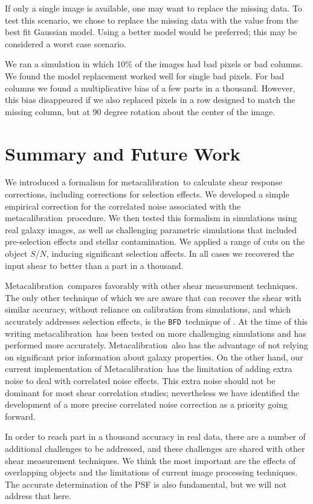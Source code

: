 \documentclass[a4paper,fleqn,usenatbib]{mnras}
\newcommand{\snr}{$S/N$}
\newcommand{\mcal}{metacalibration}
\newcommand{\Mcal}{Metacalibration}
\newcommand{\bfd}{\texttt{BFD}}
\begin{document}
If only a single image is available, one may want to replace the missing data.
To test this scenario, we chose to replace the missing data with the value from
the best fit Gaussian model.  Using a better model would be preferred; this may
be considered a worst case scenario.

We ran a simulation in which 10\% of the images had bad pixels or bad columns.
We found the model replacement worked well for single bad pixels. For bad
columns we found a multiplicative bias of a few parts in a thousand.  However,
this bias disappeared if we also replaced pixels in a row designed to match the
missing column, but at 90 degree rotation about the center of the image.

\section{Summary and Future Work}

We introduced a formalism for \mcal\ to calculate shear response corrections,
including corrections for selection effects. We developed a simple empirical
correction for the correlated noise associated with the \mcal\ procedure.  We
then tested this formalism in simulations using real galaxy images, as well as
challenging parametric simulations that included pre-selection effects and
stellar contamination.  We applied a range of cuts on the object \snr, inducing
significant selection affects.  In all cases we recovered the input shear to
better than a part in a thousand.

\Mcal\ compares favorably with other shear measurement techniques.  The only
other technique of which we are aware that can recover the shear with similar
accuracy, without reliance on calibration from simulations, and which
accurately addresses selection effects, is the \bfd\ technique of
\cite{bfd2016}.  At the time of this writing \mcal\ has been tested on more
challenging simulations and has performed more accurately.  \Mcal\ also has the
advantage of not relying on significant prior information about galaxy
properties.  On the other hand, our current implementation of \Mcal\ has the
limitation of adding extra noise to deal with correlated noise effects.  This
extra noise should not be dominant for most shear correlation studies;
nevertheless we have identified the development of a more precise
correlated noise correction as a priority going forward.

In order to reach part in a thousand accuracy in real data, there are a number
of additional challenges to be addressed, and these challenges are shared with
other shear measurement techniques. We think the most important are the effects
of overlapping objects and the limitations of current image processing
techniques.  The accurate determination of the PSF is also fundamental, but we
will not address that here.
\end{document}
